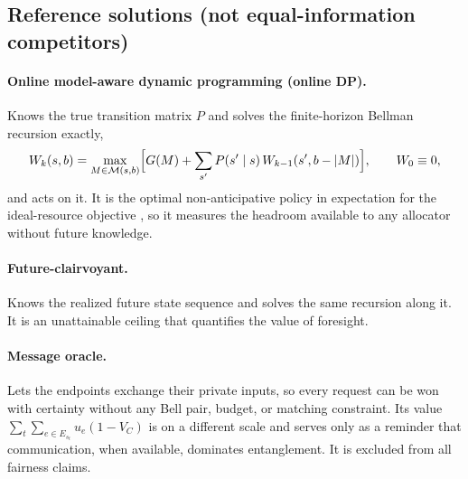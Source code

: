 \documentclass[11pt,a4paper]{article}
\newcommand{\M}{\mathcal{M}}
\begin{document}
\subsection{Reference solutions (not equal-information competitors)}\label{sec:references}

\paragraph{Online model-aware dynamic programming (online DP).} Knows the true transition matrix $P$ and solves the finite-horizon Bellman recursion exactly,
\begin{equation}
  W_k(s,b)=\max_{M\in\M(s,b)}\Bigl[G(M)+\sum_{s'}P(s'\mid s)\,W_{k-1}(s',b-|M|)\Bigr],\qquad W_0\equiv0,
\end{equation}
and acts on it. It is the optimal non-anticipative policy in expectation for the ideal-resource objective \cite{puterman1994markov}, so it measures the headroom available to any allocator without future knowledge.

\paragraph{Future-clairvoyant.} Knows the realized future state sequence and solves the same recursion along it. It is an unattainable ceiling that quantifies the value of foresight.

\paragraph{Message oracle.} Lets the endpoints exchange their private inputs, so every request can be won with certainty without any Bell pair, budget, or matching constraint. Its value $\sum_t\sum_{e\in E_{s_t}}u_e(1-V_C)$ is on a different scale and serves only as a reminder that communication, when available, dominates entanglement. It is excluded from all fairness claims.
\end{document}
